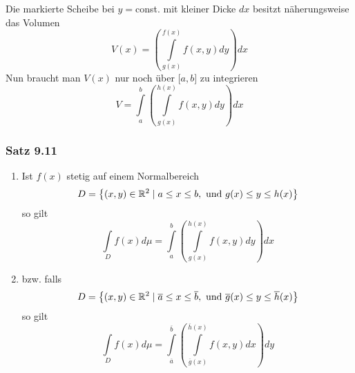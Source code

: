 Die markierte Scheibe bei $y=$const. mit kleiner Dicke $dx$ besitzt näherungsweise das Volumen
\[V(x) = \left( {\int\limits_{g(x)}^{f(x)} {f\left( {x,y} \right)dy} } \right)dx\]
Nun braucht man $V(x)$ nur noch über $\lbrack a,b\rbrack$ zu integrieren\[V = \int\limits_a^b {\left( {\int\limits_{g(x)}^{h(x)} {f\left( {x,y} \right)dy} } \right)dx} \]

\subsubsection*{Satz 9.11}
\begin{enumerate}
\item Ist $f(x)$ stetig auf einem Normalbereich \[D=\left\{ \left( x,y\right)\in\mathbb{R}^2\mid a\leq x\leq b,\text{ und }g(x)\leq y\leq h(x)\right\}\]
so gilt
\[\int\limits_D {f(x)d\mu  = \int\limits_a^b {\left( {\int\limits_{g(x)}^{h(x)} {f\left( {x,y} \right)dy} } \right)dx} } \]
\item bzw. falls \[D=\left\{ \left( x,y\right)\in\mathbb{R}^2\mid \overline{a}\leq x\leq \overline{b},\text{ und }\overline{g}(x)\leq y\leq \overline{h}(x)\right\}\]
so gilt
\[\int\limits_D {f(x)d\mu  = \int\limits_{\overline{a}}^{\overline{b}} {\left( {\int\limits_{\overline{g}(x)}^{\overline{h}(x)} {f\left( {x,y} \right)dx} } \right)dy} } \]
\end{enumerate}
